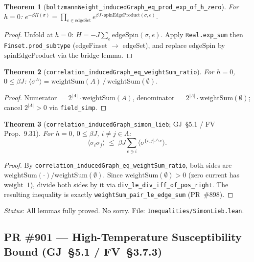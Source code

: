 \documentclass[a4paper,11pt]{article}
\newtheorem{theorem}{Theorem}
\begin{document}
\begin{theorem}[\texttt{boltzmannWeight\_inducedGraph\_eq\_prod\_exp\_of\_h\_zero}]
  For $h=0$: $e^{-\beta H(\sigma)} = \prod_{e \in \mathrm{edgeSet}} e^{\beta J \cdot \mathrm{spinEdgeProduct}(\sigma,e)}$.
\end{theorem}
\begin{proof}
  Unfold at $h=0$: $H = -J\sum_e \mathrm{edgeSpin}(\sigma,e)$.
  Apply \texttt{Real.exp\_sum} then \texttt{Finset.prod\_subtype} (edgeFinset $\to$ edgeSet),
  and replace $\mathrm{edgeSpin}$ by $\mathrm{spinEdgeProduct}$ via the bridge lemma.
\end{proof}

\begin{theorem}[\texttt{correlation\_inducedGraph\_eq\_weightSum\_ratio}]
  For $h=0$, $0\le\beta J$:
  $\langle\sigma^A\rangle = \mathrm{weightSum}(A)\,/\,\mathrm{weightSum}(\emptyset)$.
\end{theorem}
\begin{proof}
  Numerator $= 2^{|\Lambda|}\cdot\mathrm{weightSum}(A)$, denominator $= 2^{|\Lambda|}\cdot\mathrm{weightSum}(\emptyset)$;
  cancel $2^{|\Lambda|}>0$ via \texttt{field\_simp}.
\end{proof}

\begin{theorem}[\texttt{correlation\_inducedGraph\_simon\_lieb}; GJ~\S5.1 / FV Prop.~9.31]
  For $h=0$, $0\le\beta J$, $i\neq j\in\Lambda$:
  \[
    \langle\sigma_i\sigma_j\rangle \;\le\;
    \beta J \sum_{e\ni i} \langle\sigma^{\{i,j\}\triangle e}\rangle.
  \]
\end{theorem}
\begin{proof}
  By \texttt{correlation\_inducedGraph\_eq\_weightSum\_ratio}, both sides are
  $\mathrm{weightSum}(\cdot)/\mathrm{weightSum}(\emptyset)$.
  Since $\mathrm{weightSum}(\emptyset)>0$ (zero current has weight~$1$),
  divide both sides by it via \texttt{div\_le\_div\_iff\_of\_pos\_right}.
  The resulting inequality is exactly \texttt{weightSum\_pair\_le\_edge\_sum} (PR~\#898).
\end{proof}
\noindent\textit{Status}: All lemmas fully proved. No sorry. File: \texttt{Inequalities/SimonLieb.lean}.

\subsection*{PR \#901 --- High-Temperature Susceptibility Bound (GJ~\S5.1 / FV~\S3.7.3)}
\end{document}
